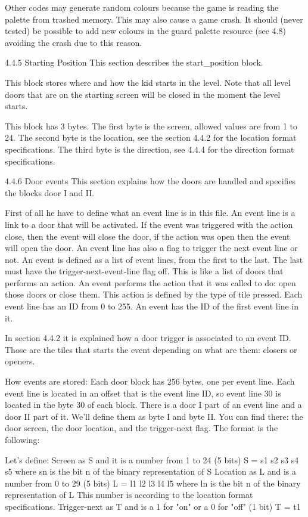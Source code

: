  Other codes may generate random colours because the game is reading
 the palette from trashed memory. This may also cause a game crash.
 It should (never tested) be possible to add new colours in the guard
 palette resource (see 4.8) avoiding the crash due to this reason.


4.4.5 Starting Position
 This section describes the start_position block.

 This block stores where and how the kid starts in the level. Note that all
 level doors that are on the starting screen will be closed in the moment
 the level starts.

 This block has 3 bytes.
 The first byte is the screen, allowed values are from 1 to 24.
 The second byte is the location, see the section 4.4.2 for the location
 format specifications.
 The third byte is the direction, see 4.4.4 for the direction format
 specifications.

4.4.6 Door events
 This section explains how the doors are handled and specifies the blocks
 door I and II.

 First of all he have to define what an event line is in this file. An
 event line is a link to a door that will be activated. If the event was
 triggered with the action close, then the event will close the door, if
 the action was open then the event will open the door. An event line has
 also a flag to trigger the next event line or not.
 An event is defined as a list of event lines, from the first to the last.
 The last must have the trigger-next-event-line flag off. This is like a
 list of doors that performs an action.
 An event performs the action that it was called to do: open those doors or
 close them. This action is defined by the type of tile pressed.
 Each event line has an ID from 0 to 255. An event has the ID of the first
 event line in it.

 In section 4.4.2 it is explained how a door trigger is associated to an
 event ID. Those are the tiles that starts the event depending on what are
 them: closers or openers.

 How events are stored:
 Each door block has 256 bytes, one per event line. Each event line is
 located in an offset that is the event line ID, so event line 30 is
 located in the byte 30 of each block.
 There is a door I part of an event line and a door II part of it. We'll
 define them as byte I and byte II.
 You can find there: the door screen, the door location, and the
 trigger-next flag. The format is the following:

 Let's define:
  Screen as S and it is a number from 1 to 24 (5 bits)
   S = s1 s2 s3 s4 s5
    where sn is the bit n of the binary representation of S
  Location as L and is a number from 0 to 29 (5 bits)
   L = l1 l2 l3 l4 l5
    where ln is the bit n of the binary representation of L
   This number is according to the location format specifications.
  Trigger-next as T and is a 1 for "on" or a 0 for "off" (1 bit)
   T = t1

